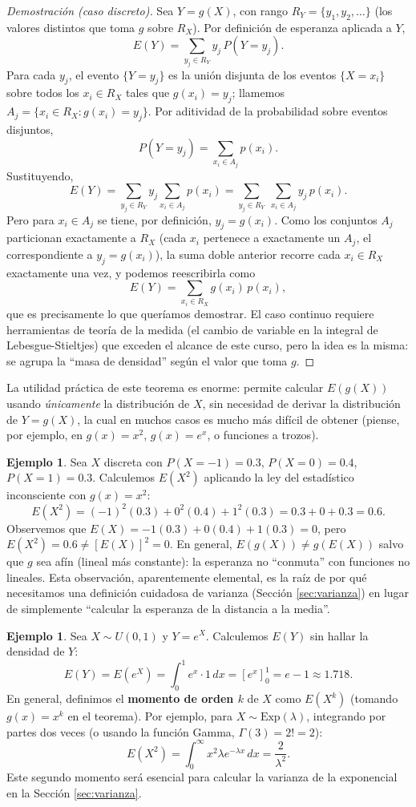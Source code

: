 \documentclass[11pt,a4paper]{article}
\theoremstyle{plain}
\theoremstyle{definition}
\newtheorem{ejemplo}[teorema]{Ejemplo}
\theoremstyle{remark}
\begin{document}
\begin{proof}[Demostración (caso discreto)]
Sea $Y=g(X)$, con rango $R_Y=\{y_1,y_2,\dots\}$ (los valores distintos que toma $g$ sobre $R_X$). Por definición de esperanza aplicada a $Y$,
\[
E(Y) = \sum_{y_j\in R_Y} y_j\, P(Y=y_j).
\]
Para cada $y_j$, el evento $\{Y=y_j\}$ es la unión disjunta de los eventos $\{X=x_i\}$ sobre todos los $x_i\in R_X$ tales que $g(x_i)=y_j$; llamemos $A_j=\{x_i\in R_X : g(x_i)=y_j\}$. Por aditividad de la probabilidad sobre eventos disjuntos,
\[
P(Y=y_j) = \sum_{x_i\in A_j} p(x_i).
\]
Sustituyendo,
\[
E(Y) = \sum_{y_j\in R_Y} y_j \sum_{x_i\in A_j} p(x_i) = \sum_{y_j\in R_Y}\ \sum_{x_i\in A_j} y_j\, p(x_i).
\]
Pero para $x_i\in A_j$ se tiene, por definición, $y_j=g(x_i)$. Como los conjuntos $A_j$ particionan exactamente a $R_X$ (cada $x_i$ pertenece a exactamente un $A_j$, el correspondiente a $y_j=g(x_i)$), la suma doble anterior recorre cada $x_i\in R_X$ exactamente una vez, y podemos reescribirla como
\[
E(Y) = \sum_{x_i \in R_X} g(x_i)\, p(x_i),
\]
que es precisamente lo que queríamos demostrar. El caso continuo requiere herramientas de teoría de la medida (el cambio de variable en la integral de Lebesgue-Stieltjes) que exceden el alcance de este curso, pero la idea es la misma: se agrupa la ``masa de densidad'' según el valor que toma $g$.
\end{proof}

La utilidad práctica de este teorema es enorme: permite calcular $E(g(X))$ usando \emph{únicamente} la distribución de $X$, sin necesidad de derivar la distribución de $Y=g(X)$, la cual en muchos casos es mucho más difícil de obtener (piense, por ejemplo, en $g(x)=x^2$, $g(x)=e^x$, o funciones a trozos).

\begin{ejemplo}
Sea $X$ discreta con $P(X=-1)=0.3$, $P(X=0)=0.4$, $P(X=1)=0.3$. Calculemos $E(X^2)$ aplicando la ley del estadístico inconsciente con $g(x)=x^2$:
\[
E(X^2) = (-1)^2(0.3) + 0^2(0.4) + 1^2(0.3) = 0.3+0+0.3 = 0.6.
\]
Observemos que $E(X) = -1(0.3)+0(0.4)+1(0.3)=0$, pero $E(X^2)=0.6 \neq [E(X)]^2=0$. En general, $E(g(X))\neq g(E(X))$ salvo que $g$ sea afín (lineal más constante): la esperanza no ``conmuta'' con funciones no lineales. Esta observación, aparentemente elemental, es la raíz de por qué necesitamos una definición cuidadosa de varianza (Sección \ref{sec:varianza}) en lugar de simplemente ``calcular la esperanza de la distancia a la media''.
\end{ejemplo}

\begin{ejemplo}
Sea $X\sim U(0,1)$ y $Y=e^X$. Calculemos $E(Y)$ sin hallar la densidad de $Y$:
\[
E(Y) = E(e^X) = \int_0^1 e^x\cdot 1\,dx = \left[e^x\right]_0^1 = e-1 \approx 1.718.
\]
En general, definimos el \textbf{momento de orden $k$} de $X$ como $E(X^k)$ (tomando $g(x)=x^k$ en el teorema). Por ejemplo, para $X\sim\text{Exp}(\lambda)$, integrando por partes dos veces (o usando la función Gamma, $\Gamma(3)=2!=2$):
\[
E(X^2) = \int_0^\infty x^2\lambda e^{-\lambda x}\,dx = \frac{2}{\lambda^2}.
\]
Este segundo momento será esencial para calcular la varianza de la exponencial en la Sección \ref{sec:varianza}.
\end{ejemplo}
\end{document}
